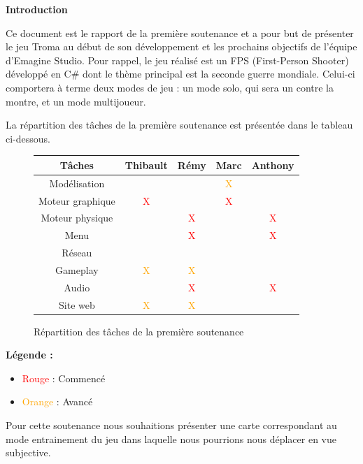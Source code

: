 \documentclass[11pt]{report}
\begin{document}
\tableofcontents

\newpage
\textbf{{\huge Introduction}} \vspace{7mm}

Ce document est le rapport de la première soutenance et a pour but de présenter le jeu Troma au début de son développement et les prochains objectifs de l’équipe d’Emagine Studio. Pour rappel, le jeu réalisé est un FPS (First-Person Shooter) développé en C\# dont le thème principal est la seconde guerre mondiale. Celui-ci comportera à terme deux modes de jeu : un mode solo, qui sera un contre la montre, et un mode multijoueur.

La répartition des tâches de la première soutenance est présentée dans le tableau ci-dessous.

\begin{figure}[htbp]
\centering
\begin{tabular}{ | c || c | c | c | c | }
\hline Tâches & Thibault & Rémy & Marc & Anthony \\
\hline Modélisation & & & \textcolor{orange}{X} & \\
\hline Moteur graphique & \textcolor{red}{X} & & \textcolor{red}{X} & \\
\hline Moteur physique & & \textcolor{red}{X} & & \textcolor{red}{X} \\
\hline Menu & & \textcolor{red}{X} & & \textcolor{red}{X} \\
\hline Réseau & & & & \\
\hline Gameplay & \textcolor{orange}{X} & \textcolor{orange}{X} & & \\
\hline Audio & & \textcolor{red}{X} & & \textcolor{red}{X} \\
\hline Site web & \textcolor{orange}{X} & \textcolor{orange}{X} & & \\
\hline
\end{tabular}
\caption{Répartition des tâches de la première soutenance}
\end{figure}

\textbf{Légende :}
\begin{itemize}
  \item \textcolor{red}{Rouge} : Commencé
  \item \textcolor{orange}{Orange} : Avancé
\end{itemize}
\vspace*{7mm}

Pour cette soutenance nous souhaitions présenter une carte correspondant au mode entrainement du jeu dans laquelle nous pourrions nous déplacer en vue subjective.
\end{document}
